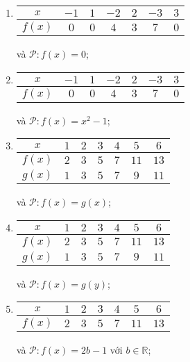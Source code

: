\begin{enumerate}
   \item
   \begin{tabular}{|c|c|c|c|c|c|c|}
      \hline
      $x$ & $-1$ & $1$ & $-2$ & $2$ & $-3$ & $3$\\
      \hline
      $f(x)$ & $0$ & $0$ & $4$ & $3$ & $7$ & $0$\\
      \hline
   \end{tabular} và $\mathcal{P}: f(x) = 0$;

   \item
   \begin{tabular}{|c|c|c|c|c|c|c|}
      \hline
      $x$ & $-1$ & $1$ & $-2$ & $2$ & $-3$ & $3$\\
      \hline
      $f(x)$ & $0$ & $0$ & $4$ & $3$ & $7$ & $0$\\
      \hline
   \end{tabular} và $\mathcal{P}: f(x) = x^2 - 1$;

   \item
   \begin{tabular}{|c|c|c|c|c|c|c|}
      \hline
      $x$ & $1$ & $2$ & $3$ & $4$ & $5$ & $6$\\
      \hline
      $f(x)$ & $2$ & $3$ & $5$ & $7$ & $11$ & $13$\\
      \hline
      $g(x)$ & $1$ & $3$ & $5$ & $7$ & $9$ & $11$\\
      \hline
   \end{tabular} và $\mathcal{P}: f(x) = g(x)$;

   \item
   \begin{tabular}{|c|c|c|c|c|c|c|}
      \hline
      $x$ & $1$ & $2$ & $3$ & $4$ & $5$ & $6$\\
      \hline
      $f(x)$ & $2$ & $3$ & $5$ & $7$ & $11$ & $13$\\
      \hline
      $g(x)$ & $1$ & $3$ & $5$ & $7$ & $9$ & $11$\\
      \hline
   \end{tabular} và $\mathcal{P}: f(x) = g(y)$;

   \item
   \begin{tabular}{|c|c|c|c|c|c|c|}
      \hline
      $x$ & $1$ & $2$ & $3$ & $4$ & $5$ & $6$\\
      \hline
      $f(x)$ & $2$ & $3$ & $5$ & $7$ & $11$ & $13$\\
      \hline
   \end{tabular} và $\mathcal{P}: f(x) = 2b-1$ với $b \in \mathbb{R}$;


\end{enumerate}
